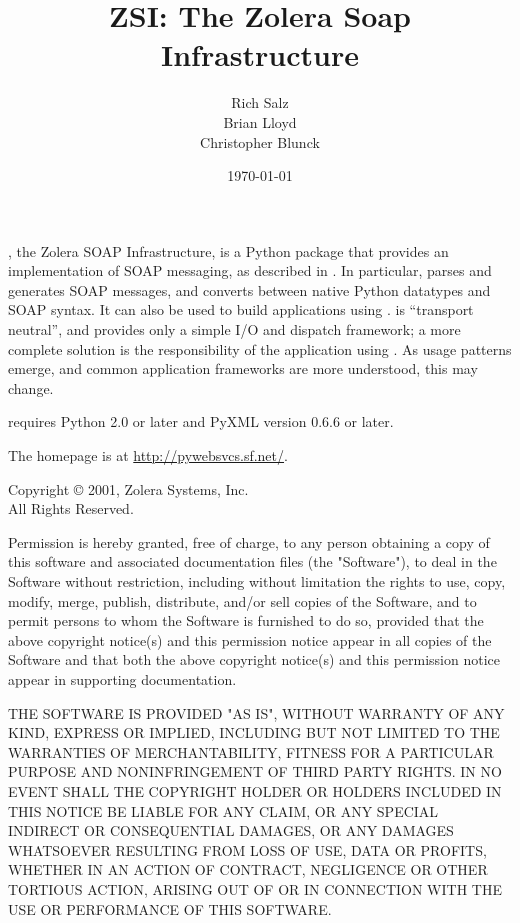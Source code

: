 \documentclass{manual}
\title{ZSI: The Zolera Soap Infrastructure}
\author{Rich Salz\\
        Brian Lloyd\\
        Christopher Blunck}
\date{\today}
\begin{document}
\maketitle

\centerline{}

, the Zolera SOAP Infrastructure, is a Python package that
provides an implementation of SOAP messaging, as described in
.
In particular,  parses and generates SOAP messages, and
converts between native Python datatypes and SOAP syntax.
It can also be used to build applications using
.
 is ``transport neutral'', and provides only a simple
I/O and dispatch framework; a more complete solution is the
responsibility of the application using .
As usage patterns emerge, and common application frameworks are
more understood, this may change.

 requires Python 2.0 or later and PyXML version 0.6.6 or later.

The  homepage is at
\url{http://pywebsvcs.sf.net/}.

\vfill

\centerline{}

Copyright \copyright{} 2001, Zolera Systems, Inc.\\
All Rights Reserved.

Permission is hereby granted, free of charge, to any person obtaining a
copy of this software and associated documentation files (the "Software"),
to deal in the Software without restriction, including without limitation
the rights to use, copy, modify, merge, publish, distribute, and/or
sell copies of the Software, and to permit persons to whom the Software
is furnished to do so, provided that the above copyright notice(s) and
this permission notice appear in all copies of the Software and that
both the above copyright notice(s) and this permission notice appear in
supporting documentation.

THE SOFTWARE IS PROVIDED "AS IS", WITHOUT WARRANTY OF ANY KIND,
EXPRESS OR IMPLIED, INCLUDING BUT NOT LIMITED TO THE WARRANTIES OF
MERCHANTABILITY, FITNESS FOR A PARTICULAR PURPOSE AND NONINFRINGEMENT
OF THIRD PARTY RIGHTS. IN NO EVENT SHALL THE COPYRIGHT HOLDER OR HOLDERS
INCLUDED IN THIS NOTICE BE LIABLE FOR ANY CLAIM, OR ANY SPECIAL INDIRECT
OR CONSEQUENTIAL DAMAGES, OR ANY DAMAGES WHATSOEVER RESULTING FROM LOSS
OF USE, DATA OR PROFITS, WHETHER IN AN ACTION OF CONTRACT, NEGLIGENCE
OR OTHER TORTIOUS ACTION, ARISING OUT OF OR IN CONNECTION WITH THE USE
OR PERFORMANCE OF THIS SOFTWARE.
\end{document}
